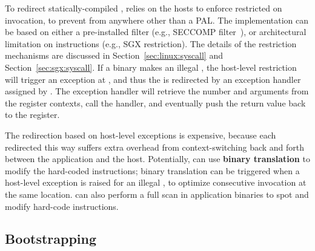 To redirect statically-compiled \linuxapis{}, \thelibos{} relies on the hosts to enforce restricted on
\linuxapi{} invocation,
to prevent \linuxapis{} from anywhere other than a PAL.
The implementation can be based on either a pre-installed \linuxapi{} filter
(e.g., SECCOMP filter~\cite{seccomp}),
or architectural limitation on  instructions
(e.g., SGX restriction).
The details of the \linuxapi{} restriction mechanisms are discussed in
Section~\ref{sec:linux:syscall} and Section~\ref{sec:sgx:syscall}.
If a binary makes an illegal \linuxapi{},
the host-level \linuxapi{} restriction will trigger an  exception
at \thehostabi{},
and thus the \linuxapi{} is redirected by an exception handler
assigned by \thelibos{}.
The exception handler will retrieve the \linuxapi{} number and arguments
from the register contexts,
call the \linuxapi{} handler,
and eventually push the \linuxapi{} return value back to the  register.


The \linuxapi{} redirection based on
host-level exceptions
is expensive, because each \linuxapi{} redirected this way
suffers extra overhead
from context-switching back and forth between the application and the host.
Potentially,
\thelibos{} can use {\bf binary translation} to modify the hard-coded  instructions;
binary translation
can be triggered when a host-level exception is raised
for an illegal \linuxapi{},
to optimize consecutive \linuxapi{} invocation at the same location.
\thelibos{} can also perform a full scan in application binaries
to spot and modify hard-code  instructions.









\subsection{Bootstrapping}






